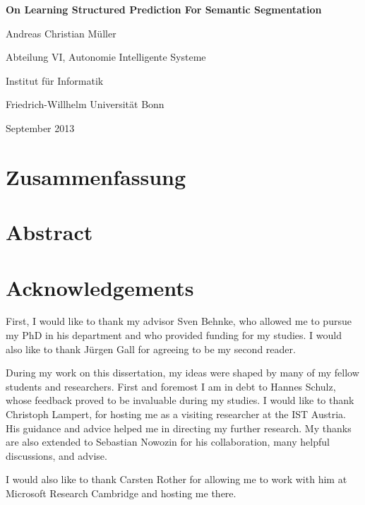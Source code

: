 \documentclass[12pt,toc=bibnumbered, a4paper,twoside]{scrbook}
\begin{document}
\begin{titlepage}
\begin{center}
\vspace*{1in}
\textbf{{\LARGE On Learning Structured Prediction For Semantic Segmentation}}
\par
\vspace{1.5in} {\large Andreas Christian M\"uller}
\par \vspace{0.5in}
Abteilung VI, Autonomie Intelligente Systeme \par
Institut f\"ur Informatik
\par \vspace{0.5in}
Friedrich-Willhelm Universit\"at Bonn \par
\vspace{0.5in} September 2013 \end{center}

\end{titlepage}


\tableofcontents

\chapter*{Zusammenfassung}
\chapter*{Abstract}

\chapter*{Acknowledgements}
First, I would like to thank my advisor Sven Behnke, who allowed me
to pursue my PhD in his department and who provided funding for my studies.
I would also like to thank J\"urgen Gall for agreeing to be my second reader.

During my work on this dissertation, my ideas were shaped by many of my fellow
students and researchers. First and foremost I am in debt to Hannes Schulz,
whose feedback proved to be invaluable during my studies.
I would like to thank Christoph Lampert, for hosting me as a visiting researcher
at the IST Austria. His guidance and advice helped me in directing my further
research. My thanks are also extended to Sebastian Nowozin for his collaboration,
many helpful discussions, and advise.

I would also like to thank Carsten Rother for allowing me to work with him
at Microsoft Research Cambridge and hosting me there.
\end{document}
